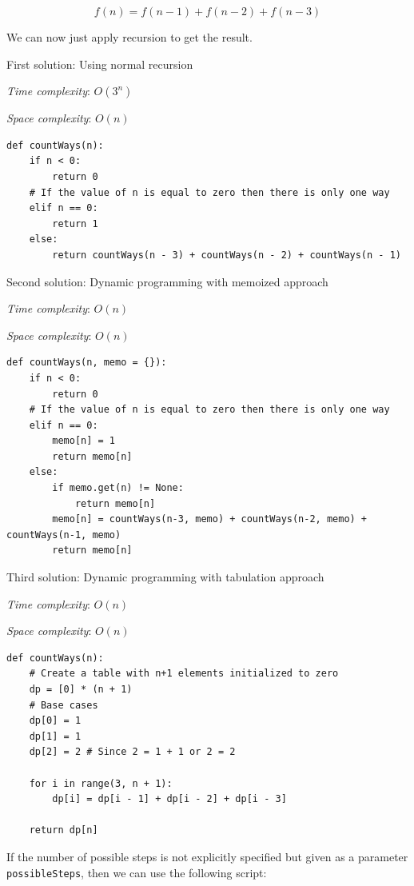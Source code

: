 \documentclass[a4paper,11pt]{book}
\begin{document}
$$f(n) = f(n-1)+f(n-2)+f(n-3)$$

\noindent We can now just apply recursion to get the result.
\vspace{3mm}

\noindent First solution: Using normal recursion

\noindent \textit{Time complexity}: $O(3^n)$

\noindent \textit{Space complexity}: $O(n)$

\begin{lstlisting}
def countWays(n):
    if n < 0:
        return 0
    # If the value of n is equal to zero then there is only one way
    elif n == 0:
        return 1
    else:
        return countWays(n - 3) + countWays(n - 2) + countWays(n - 1)
\end{lstlisting}

\noindent Second solution: Dynamic programming with memoized approach

\noindent \textit{Time complexity}: $O(n)$

\noindent \textit{Space complexity}: $O(n)$

\begin{lstlisting}
def countWays(n, memo = {}):
    if n < 0:
        return 0
    # If the value of n is equal to zero then there is only one way
    elif n == 0:
        memo[n] = 1
        return memo[n]
    else:
        if memo.get(n) != None:
            return memo[n]
        memo[n] = countWays(n-3, memo) + countWays(n-2, memo) + countWays(n-1, memo)
        return memo[n]
\end{lstlisting}

\noindent Third solution: Dynamic programming with tabulation approach

\noindent \textit{Time complexity}: $O(n)$

\noindent \textit{Space complexity}: $O(n)$

\begin{lstlisting}
def countWays(n):
    # Create a table with n+1 elements initialized to zero
    dp = [0] * (n + 1)
    # Base cases
    dp[0] = 1
    dp[1] = 1
    dp[2] = 2 # Since 2 = 1 + 1 or 2 = 2
 
    for i in range(3, n + 1):
        dp[i] = dp[i - 1] + dp[i - 2] + dp[i - 3]
 
    return dp[n]
\end{lstlisting}


\noindent If the number of possible steps is not explicitly specified but given as a parameter \lstinline{possibleSteps}, then we can use the following script:
\end{document}
